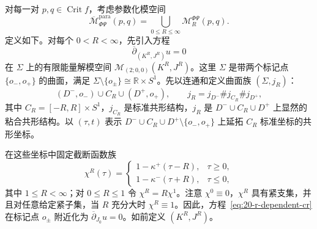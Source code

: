 对每一对 $p,q\in\operatorname{Crit}f$，考虑参数化模空间
\[
 \overline{\mathcal M}_{\Phi\Psi}^{\mathrm{para}}(p,q)
 =\bigcup_{0\leq R\leq\infty}\mathcal M_R^{\Phi\Psi}(p,q).
\]
定义如下。对每个 $0<R<\infty$，先引入方程
\begin{equation}
 \overline\partial_{(K^R,J^R)}u=0
 \label{eq:20-r-dependent-cr}
\end{equation}
在 $\Sigma$ 上的有限能量解模空间
$\mathcal M_{(2;0,0)}(K^R,J^R)$。这里 $\Sigma$ 是带两个标记点
$\{o_-,o_+\}$ 的\personRiemann{}曲面，满足
$\Sigma\setminus\{o_\pm\}\cong\mathbb R\times S^1$。先以连通和定义\personRiemann{}曲面族 $(\Sigma,j_R)$：
\[
 (D^-,o_-)\cup C_R\cup(D^+,o_+),\qquad
 j_R=j_{D^-}\#j_{C_R}\#j_{D^+},
\]
其中 $C_R=[-R,R]\times S^1$，$j_{C_R}$ 是标准共形结构，$j_R$ 是
$D^-\cup C_R\cup D^+$ 上显然的粘合共形结构。以 $(\tau,t)$ 表示
$D^-\cup C_R\cup D^+\setminus\{o_-,o_+\}$ 上延拓 $C_R$ 标准坐标的共形坐标。

在这些坐标中固定截断函数族
\[
 \chi^R(\tau)=\begin{cases}
 1-\kappa^+(\tau-R),&\tau\geq0,\\
 1-\kappa^-(\tau+R),&\tau\leq0,
 \end{cases}
\]
其中 $1\leq R<\infty$；对 $0\leq R\leq1$ 令 $\chi^R=R\chi^1$。注意
$\chi^0\equiv0$，$\chi^R$ 具有紧支集，并且对任意给定紧子集，当 $R$ 充分大时
$\chi^R\equiv1$。因此，方程~\eqref{eq:20-r-dependent-cr} 在标记点 $o_\pm$ 附近化为
$\overline\partial_{J_0}u=0$。如前定义 $(K^R,J^R)$。

